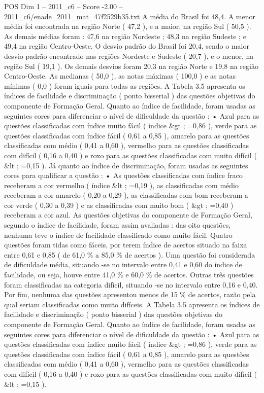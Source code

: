 \begin{textsample}{POS Dim 1 – 2011\_c6 – Score -2.00 – 2011\_c6/enade\_2011\_mat\_47f2529b35.txt}
A média do Brasil foi 48,4.
A menor média foi encontrada na região Norte ( 47,2 ), e a maior, na região Sul ( 50,5 ).
As demais médias foram : 47,6 na região Nordeste ; 48,3 na região Sudeste ; e 49,4 na região Centro-Oeste.
O desvio padrão do Brasil foi 20,4, sendo o maior desvio padrão encontrado nas regiões Nordeste e Sudeste ( 20,7 ), e o menor, na região Sul ( 19,1 ).
Os demais desvios foram 20,3 na região Norte e 19,8 na região Centro-Oeste.
As medianas ( 50,0 ), as notas máximas ( 100,0 ) e as notas mínimas ( 0,0 ) foram iguais para todas as regiões.
A Tabela 3.5 apresenta os índices de facilidade e discriminação ( ponto bisserial ) das questões objetivas do componente de Formação Geral.
Quanto ao índice de facilidade, foram usadas as seguintes cores para diferenciar o nível de dificuldade da questão : • Azul para as questões classificadas com índice muito fácil ( índice \&gt ; =0,86 ), verde para as questões classificadas com índice fácil ( 0,61 a 0,85 ), amarelo para as questões classificadas com médio ( 0,41 a 0,60 ), vermelho para as questões classificadas com difícil ( 0,16 a 0,40 ) e roxo para as questões classificadas com muito difícil ( \&lt ; =0,15 ).
Já quanto ao índice de discriminação, foram usadas as seguintes cores para qualificar a questão : • As questões classificadas com índice fraco receberam a cor vermelho ( índice \&lt ; =0,19 ), as classificadas com médio receberam a cor amarelo ( 0,20 a 0,29 ), as classificadas com bom receberam a cor verde ( 0,30 a 0,39 ) e as classificadas com muito bom ( \&gt ; =0,40 ) receberam a cor azul.
As questões objetivas do componente de Formação Geral, segundo o índice de facilidade, foram assim avaliadas : das oito questões, nenhuma teve o índice de facilidade classificado como muito fácil.
Quatro questões foram tidas como fáceis, por terem índice de acertos situado na faixa entre 0,61 e 0,85 ( de 61,0 \% a 85,0 \% de acertos ).
Uma questão foi considerada de dificuldade média, situando -se no intervalo entre 0,41 e 0,60 do índice de facilidade, ou seja, houve entre 41,0 \% e 60,0 \% de acertos.
Outras três questões foram classificadas na categoria difícil, situando -se no intervalo entre 0,16 e 0,40.
Por fim, nenhuma das questões apresentou menos de 15 \% de acertos, razão pela qual seriam classificadas como muito difíceis.
A Tabela 3.5 apresenta os índices de facilidade e discriminação ( ponto bisserial ) das questões objetivas do componente de Formação Geral.
Quanto ao índice de facilidade, foram usadas as seguintes cores para diferenciar o nível de dificuldade da questão : • Azul para as questões classificadas com índice muito fácil ( índice \&gt ; =0,86 ), verde para as questões classificadas com índice fácil ( 0,61 a 0,85 ), amarelo para as questões classificadas com médio ( 0,41 a 0,60 ), vermelho para as questões classificadas com difícil ( 0,16 a 0,40 ) e roxo para as questões classificadas com muito difícil ( \&lt ; =0,15 ).

\end{textsample}
